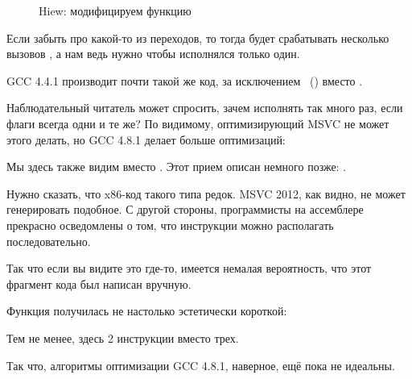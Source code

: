 \begin{figure}[H]
\centering
{}
\caption{Hiew: модифицируем функцию }
\label{fig:jcc_hiew_2}
\end{figure}

Если забыть про какой-то из переходов, то тогда будет срабатывать несколько вызовов \printf, 
а нам ведь нужно чтобы исполнялся только один.


\NonOptimizing GCC 4.4.1 производит почти такой же код, за исключением \puts~() вместо \printf.


Наблюдательный читатель может спросить, зачем исполнять \CMP так много раз,
если флаги всегда одни и те же?
По видимому, оптимизирующий MSVC не может этого делать, но GCC 4.8.1 делает больше оптимизаций:



Мы здесь также видим  вместо .
Этот прием описан немного позже: .

Нужно сказать, что x86-код такого типа редок.
MSVC 2012, как видно, не может генерировать подобное.
С другой стороны, программисты на ассемблере прекрасно осведомлены о том,
что инструкции  можно располагать последовательно.

Так что если вы видите это где-то, имеется немалая вероятность, что этот фрагмент кода был написан вручную.

Функция  получилась не настолько эстетически короткой:



Тем не менее, здесь 2 инструкции  вместо трех.

Так что, алгоритмы оптимизации GCC 4.8.1, наверное, ещё пока не идеальны.
